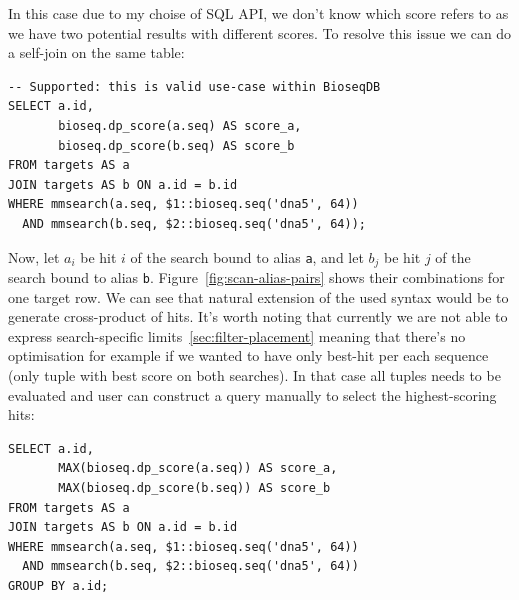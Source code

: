 In this case due to my choise of SQL API, we don't know which score  refers to as we have two potential results with different scores.
To resolve this issue we can do a self-join on the same table:

\begin{minipage}{\linewidth}
\begin{lstlisting}[style=bioseq-search-sql,caption={Give each independent search its own target binding.}]
-- Supported: this is valid use-case within BioseqDB
SELECT a.id,
       bioseq.dp_score(a.seq) AS score_a,
       bioseq.dp_score(b.seq) AS score_b
FROM targets AS a
JOIN targets AS b ON a.id = b.id
WHERE mmsearch(a.seq, $1::bioseq.seq('dna5', 64))
  AND mmsearch(b.seq, $2::bioseq.seq('dna5', 64));
\end{lstlisting}
\end{minipage}

Now, let $a_i$ be hit $i$ of the search bound to alias \texttt{a}, and let $b_j$
be hit $j$ of the search bound to alias \texttt{b}. Figure~\ref{fig:scan-alias-pairs}
shows their combinations for one target row. We can see that natural extension of the used syntax would be to generate cross-product of hits.
It's worth noting that currently we are not able to express search-specific limits~\ref{sec:filter-placement} meaning that there's no optimisation for example if we wanted to have only best-hit per each sequence (only tuple with best score on both searches). In that case all tuples needs to be evaluated and user can construct a query manually
to select the highest-scoring hits:

\begin{minipage}{\linewidth}
\begin{lstlisting}[style=bioseq-search-sql,caption={Keep one highest score from each of the two searches, per stored row.}]
SELECT a.id,
       MAX(bioseq.dp_score(a.seq)) AS score_a,
       MAX(bioseq.dp_score(b.seq)) AS score_b
FROM targets AS a
JOIN targets AS b ON a.id = b.id
WHERE mmsearch(a.seq, $1::bioseq.seq('dna5', 64))
  AND mmsearch(b.seq, $2::bioseq.seq('dna5', 64))
GROUP BY a.id;
\end{lstlisting}
\end{minipage}

